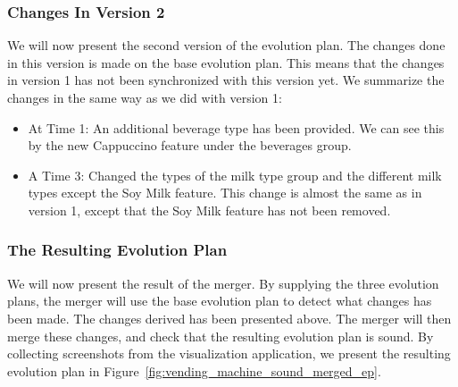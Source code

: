 \documentclass[a4paper,english]{ifimaster}
\begin{document}
\subsubsection{Changes In Version 2}%
\label{ssub:changes_in_version_2}

We will now present the second version of the evolution plan. The changes done in this version is made on the base evolution plan. This means that the changes in version 1 has not been synchronized with this version yet. We summarize the changes in the same way as we did with version 1:

\begin{itemize}
  \item At Time 1: An additional beverage type has been provided. We can see this by the new Cappuccino feature under the beverages group.
  \item A Time 3: Changed the types of the milk type group and the different milk types except the Soy Milk feature. This change is almost the same as in version 1, except that the Soy Milk feature has not been removed.
\end{itemize}

\subsubsection{The Resulting Evolution Plan}%
\label{ssub:the_resulting_evolution_plan}

We will now present the result of the merger. By supplying the three evolution plans, the merger will use the base evolution plan to detect what changes has been made. The changes derived has been presented above. The merger will then merge these changes, and check that the resulting evolution plan is sound. By collecting screenshots from the visualization application, we present the resulting evolution plan in Figure~\vref{fig:vending_machine_sound_merged_ep}.
\end{document}
